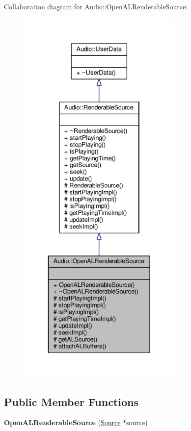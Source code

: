 Collaboration diagram for Audio\+:\+:Open\+A\+L\+Renderable\+Source\+:
\nopagebreak
\begin{figure}[H]
\begin{center}
\leavevmode
\includegraphics[height=550pt]{dc/db7/classAudio_1_1OpenALRenderableSource__coll__graph}
\end{center}
\end{figure}
\subsection*{Public Member Functions}
\begin{DoxyCompactItemize}
\item 
{\bfseries Open\+A\+L\+Renderable\+Source} (\hyperlink{classAudio_1_1Source}{Source} $\ast$source)\hypertarget{classAudio_1_1OpenALRenderableSource_a87ef1f7f97bce98cf54c10ae6a86b351}{}\label{classAudio_1_1OpenALRenderableSource_a87ef1f7f97bce98cf54c10ae6a86b351}

\end{DoxyCompactItemize}
